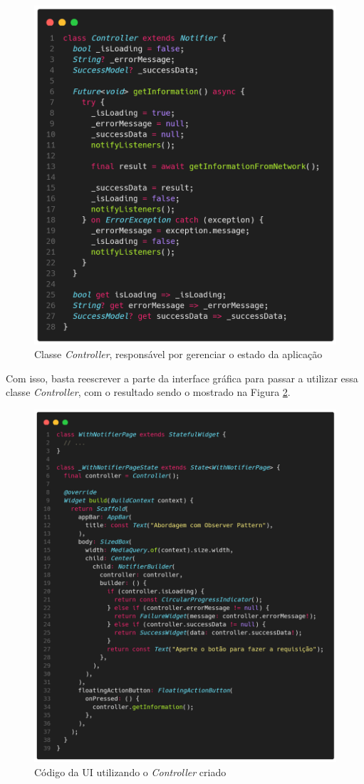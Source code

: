 \documentclass[12pt, %
openright, 
oneside, %
a4paper,    %
brazil]{facom-ufu-abntex2}
\begin{document}
\begin{figure}[ht]
    \centering
    \includegraphics[width=.65\textwidth, trim={0 30 0 100}, clip]{figures/states/notifier_controller.png}
    \caption{Classe \textit{Controller}, responsável por gerenciar o estado da aplicação}
    \label{fig:notifier_controller}
\end{figure}

Com isso, basta reescrever a parte da interface gráfica para passar a utilizar essa classe \textit{Controller}, com o resultado sendo o mostrado na Figura \ref{fig:with_notifier_page}.

\begin{figure}[ht]
    \centering
    \includegraphics[width=.65\textwidth, trim={0 30 0 100}, clip]{figures/states/with_notifier_page.png}
    \caption{Código da UI utilizando o \textit{Controller} criado}
    \label{fig:with_notifier_page}
\end{figure}
\end{document}
